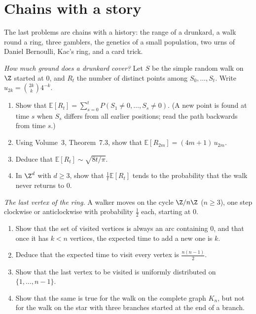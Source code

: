 \section{Chains with a story}

The last problems are chains with a history: the range of a drunkard, a walk round a ring, three gamblers, the genetics of a
small population, two urns of Daniel Bernoulli, Kac's ring, and a card trick.

\begin{exercise}[$\star\star$]\label{pb:range}
\emph{How much ground does a drunkard cover?} Let $S$ be the simple random walk on $\Z$ started at $0$, and $R_t$ the number of distinct
points among $S_0,\dots,S_t$. Write $u_{2k}=\binom{2k}k4^{-k}$.
\begin{enumerate}[label=(\alph*)]
\item Show that $\mathbb E[R_t]=\sum_{s=0}^tP(S_1\ne0,\dots,S_s\ne0)$. (A new point is found at time $s$ when $S_s$ differs from all earlier positions; read the path backwards
from time $s$.)
\item Using Volume~3, Theorem~7.3, show that $\mathbb E[R_{2m}]=(4m+1)\,u_{2m}$.
\item Deduce that $\mathbb E[R_t]\sim\sqrt{8t/\pi}$.
\item In $\Z^d$ with $d\ge3$, show that $\frac1t\mathbb E[R_t]$ tends to the probability that the walk never returns to $0$.
\end{enumerate}
\end{exercise}

\begin{exercise}[$\star\star$]\label{pb:cyclecover}
\emph{The last vertex of the ring.} A walker moves on the cycle $\Z/n\Z$ ($n\ge3$), one step clockwise or anticlockwise with probability
$\frac12$ each, starting at $0$.
\begin{enumerate}[label=(\alph*)]
\item Show that the set of visited vertices is always an arc containing $0$, and that once it has $k<n$ vertices, the expected
time to add a new one is $k$.
\item Deduce that the expected time to visit every vertex is $\frac{n(n-1)}2$.
\item Show that the last vertex to be visited is uniformly distributed on $\{1,\dots,n-1\}$.
\item Show that the same is true for the walk on the complete graph $K_n$, but not for the walk on the star with three branches
started at the end of a branch.
\end{enumerate}
\end{exercise}

